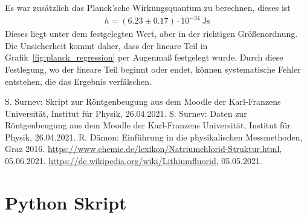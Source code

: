 \documentclass{article}
\begin{document}
Es war zusätzlich das Planck'sche Wirkungsquantum zu berechnen, dieses ist
\begin{align*}
h = (6.23 \pm 0.17)\cdot 10^{-34}~\text{Js}
\end{align*}
Dieses liegt unter dem festgelegten Wert, aber in der richtigen Größenordnung. Die Unsicherheit kommt daher, dass der lineare Teil in Grafik~\ref{fig:planck_regression} per Augenmaß festgelegt wurde. Durch diese Festlegung, wo der lineare Teil beginnt oder endet, können systematische Fehler entstehen, die das Ergebnis verfälschen.




\begin{thebibliography}{9}
 S. Surnev: Skript zur Röntgenbeugung aus dem Moodle der Karl-Franzens Universität, Institut für Physik, 26.04.2021.
 S. Surnev: Daten zur Röntgenbeugung aus dem Moodle der Karl-Franzens Universität, Institut für Physik, 26.04.2021.
  R. Dämon: Einführung in die physikalischen Messmethoden, Graz 2016.
 \url{https://www.chemie.de/lexikon/Natriumchlorid-Struktur.html}, 05.06.2021.
 \url{https://de.wikipedia.org/wiki/Lithiumfluorid}, 05.05.2021.
\end{thebibliography}


\newpage 
\appendix
\section{Python Skript}




%

%
\end{document}
